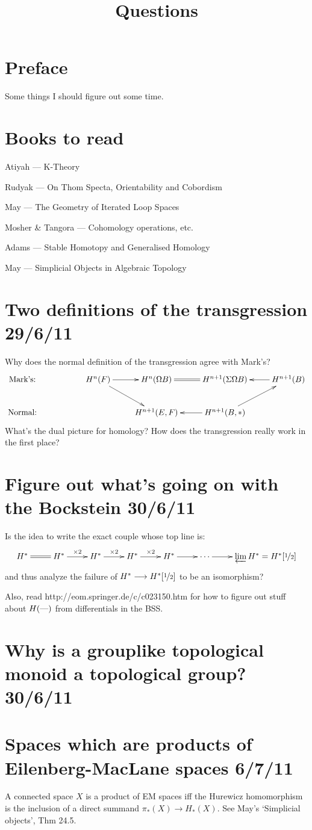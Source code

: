 \documentclass[11pt]{article}
\title{Questions}
\author{}
\date{}
\begin{document}
\newcommand{\HSsection}[2]{\section*{#1 \hfill \small{#2}}}

\HSsection{Preface}{}
Some things I should figure out some time.

\HSsection{Books to read}{}
\newcommand{\BooK}[2]{\item #1 --- #2}
\begin{itemise}
\BooK{Atiyah}{K-Theory}
\BooK{Rudyak}{On Thom Specta, Orientability and Cobordism}
\BooK{May}{The Geometry of Iterated Loop Spaces}
\BooK{Mosher \& Tangora}{Cohomology operations, etc.}
\BooK{Adams}{Stable Homotopy and Generalised Homology}
\BooK{May}{Simplicial Objects in Algebraic Topology}
\end{itemise}

\HSsection{Two definitions of the transgression}{29/6/11}
Why does the normal definition of the transgression agree with Mark's?
\[\xymatrix{
\text{Mark's:}&&\ar[dr]H^n(F)\ar[r]& H^n(\Omega B)\ar@{=}[r]&H^{n+1}(\Sigma\Omega B)&\ar[l] H^{n+1}(B)\\
\text{Normal:}&&&H^{n+1}(E,F)&H^{n+1}(B,*)\ar[ru]\ar[l]
}\]
What's the dual picture for homology?
How does the transgression really work in the first place?
\HSsection{Figure out what's going on with the Bockstein}{30/6/11}
Is the idea to write the exact couple whose top line is:
\[\xymatrix{
H^*\ar@{=}[r]&H^*\ar[r]^{\times2}&H^*\ar[r]^{\times2}&H^*\ar[r]^{\times2}&H^*\ar[r]&\cdots\ar[r]&\varprojlim H^*=H^*[\nicefrac{1}{2}]
}\]
and thus analyze the failure of $H^*\to H^*[\nicefrac{1}{2}]$ to be an isomorphism?

Also, read http://eom.springer.de/c/c023150.htm for how to figure out stuff about $H(\DASH)$ from differentials in the BSS.
\HSsection{Why is a grouplike topological monoid a topological group?}{30/6/11}

\HSsection{Spaces which are products of Eilenberg-MacLane spaces}{6/7/11}
A connected space $X$ is a product of EM spaces iff the Hurewicz homomorphism is the 
inclusion of a direct summand $\pi_*(X)\to H_*(X)$. See May's `Simplicial objects',
Thm 24.5.
\end{document}
